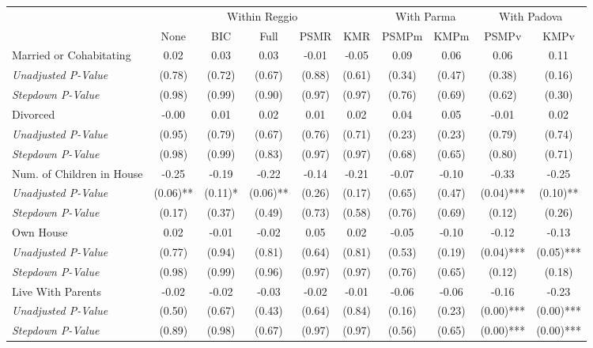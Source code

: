 \begin{tabular}{l c c c c c c c c c}
\toprule
& \multicolumn{5}{c}{Within Reggio} & \multicolumn{2}{c}{With Parma} & \multicolumn{2}{c}{With Padova} \\\cmidrule(lr){2-6} \cmidrule(lr){7-8} \cmidrule(lr){9-10}
 & None & BIC & Full & PSMR & KMR & PSMPm & KMPm & PSMPv & KMPv \\
\midrule
Married or Cohabitating & 0.02 & 0.03 & 0.03 & -0.01 & -0.05 & 0.09 & 0.06 & 0.06 & 0.11 \\
\quad \textit{Unadjusted P-Value} & (0.78) & (0.72) & (0.67) & (0.88) & (0.61) & (0.34) & (0.47) & (0.38) & (0.16) \\
\quad \textit{Stepdown P-Value} & (0.98) & (0.99) & (0.90) & (0.97) & (0.97) & (0.76) & (0.69) & (0.62) & (0.30) \\
Divorced & -0.00 & 0.01 & 0.02 & 0.01 & 0.02 & 0.04 & 0.05 & -0.01 & 0.02 \\
\quad \textit{Unadjusted P-Value} & (0.95) & (0.79) & (0.67) & (0.76) & (0.71) & (0.23) & (0.23) & (0.79) & (0.74) \\
\quad \textit{Stepdown P-Value} & (0.98) & (0.99) & (0.83) & (0.97) & (0.97) & (0.68) & (0.65) & (0.80) & (0.71) \\
Num. of Children in House & -0.25 & -0.19 & -0.22 & -0.14 & -0.21 & -0.07 & -0.10 & -0.33 & -0.25 \\
\quad \textit{Unadjusted P-Value} & (0.06)** & (0.11)* & (0.06)** & (0.26) & (0.17) & (0.65) & (0.47) & (0.04)*** & (0.10)** \\
\quad \textit{Stepdown P-Value} & (0.17) & (0.37) & (0.49) & (0.73) & (0.58) & (0.76) & (0.69) & (0.12) & (0.26) \\
Own House & 0.02 & -0.01 & -0.02 & 0.05 & 0.02 & -0.05 & -0.10 & -0.12 & -0.13 \\
\quad \textit{Unadjusted P-Value} & (0.77) & (0.94) & (0.81) & (0.64) & (0.81) & (0.53) & (0.19) & (0.04)*** & (0.05)*** \\
\quad \textit{Stepdown P-Value} & (0.98) & (0.99) & (0.96) & (0.97) & (0.97) & (0.76) & (0.65) & (0.12) & (0.18) \\
Live With Parents & -0.02 & -0.02 & -0.03 & -0.02 & -0.01 & -0.06 & -0.06 & -0.16 & -0.23 \\
\quad \textit{Unadjusted P-Value} & (0.50) & (0.67) & (0.43) & (0.64) & (0.84) & (0.16) & (0.23) & (0.00)*** & (0.00)*** \\
\quad \textit{Stepdown P-Value} & (0.89) & (0.98) & (0.67) & (0.97) & (0.97) & (0.56) & (0.65) & (0.00)*** & (0.00)*** \\
\bottomrule
\end{tabular}
